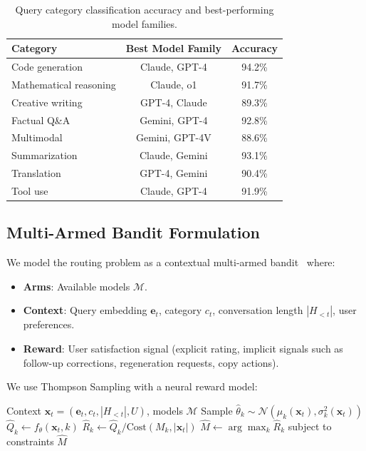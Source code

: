 \documentclass[11pt,twocolumn]{article}
\begin{document}
\begin{table}[H]
\centering
\small
\begin{tabular}{lcc}
\toprule
\textbf{Category} & \textbf{Best Model Family} & \textbf{Accuracy} \\
\midrule
Code generation & Claude, GPT-4 & 94.2\% \\
Mathematical reasoning & Claude, o1 & 91.7\% \\
Creative writing & GPT-4, Claude & 89.3\% \\
Factual Q\&A & Gemini, GPT-4 & 92.8\% \\
Multimodal & Gemini, GPT-4V & 88.6\% \\
Summarization & Claude, Gemini & 93.1\% \\
Translation & GPT-4, Gemini & 90.4\% \\
Tool use & Claude, GPT-4 & 91.9\% \\
\bottomrule
\end{tabular}
\caption{Query category classification accuracy and best-performing model families.}
\label{tab:categories}
\end{table}

\subsection{Multi-Armed Bandit Formulation}

We model the routing problem as a contextual multi-armed bandit~\cite{li2010contextual} where:

\begin{itemize}[leftmargin=1.1em]
    \item \textbf{Arms}: Available models $\mathcal{M}$.
    \item \textbf{Context}: Query embedding $\bm{e}_t$, category $c_t$, conversation length $|H_{<t}|$, user preferences.
    \item \textbf{Reward}: User satisfaction signal (explicit rating, implicit signals such as follow-up corrections, regeneration requests, copy actions).
\end{itemize}

We use Thompson Sampling with a neural reward model:

\begin{algorithm}[H]
\caption{Neural Thompson Sampling for Model Routing}
\label{alg:thompson}
\begin{algorithmic}[1]
\Require Context $\bm{x}_t = (\bm{e}_t, c_t, |H_{<t}|, U)$, models $\mathcal{M}$
    \State Sample $\hat{\theta}_k \sim \mathcal{N}(\mu_k(\bm{x}_t), \sigma_k^2(\bm{x}_t))$
    \State $\hat{Q}_k \gets f_\theta(\bm{x}_t, k)$ 
    \State $\hat{R}_k \gets \hat{Q}_k / \text{Cost}(M_k, |\bm{x}_t|)$ 
\EndFor
\State $\hat{M} \gets \arg\max_k \hat{R}_k$ subject to constraints
\State \Return $\hat{M}$
\end{algorithmic}
\end{algorithm}
\end{document}
